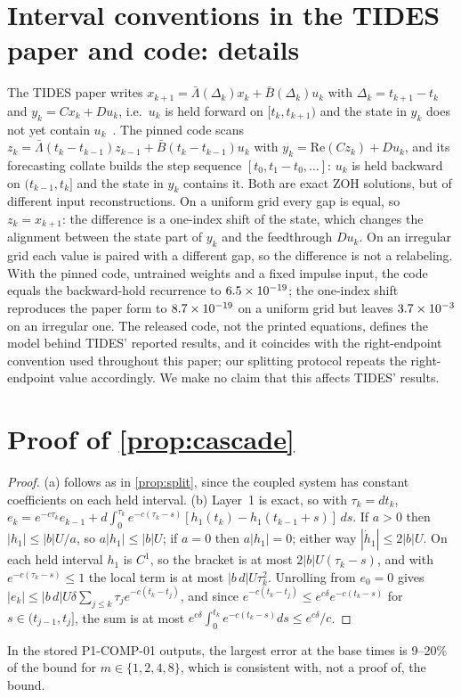 \documentclass{article}
\theoremstyle{plain}
\theoremstyle{definition}
\theoremstyle{remark}
\begin{document}




\FloatBarrier
\section{Interval conventions in the TIDES paper and code: details}
\label{app:convention}

The TIDES paper writes $x_{k+1}=\bar\Lambda(\Delta_k)x_k+\bar B(\Delta_k)u_k$ with $\Delta_k=t_{k+1}-t_k$ and $y_k=Cx_k+Du_k$, i.e.\ $u_k$ is held forward on $[t_k,t_{k+1})$ and the state in $y_k$ does not yet contain $u_k$~\citep{soydan2026tides}.
The pinned code scans $z_k=\bar\Lambda(t_k-t_{k-1})z_{k-1}+\bar B(t_k-t_{k-1})u_k$ with $y_k=\mathrm{Re}(Cz_k)+Du_k$, and its forecasting collate builds the step sequence $[t_0,t_1-t_0,\dots]$: $u_k$ is held backward on $(t_{k-1},t_k]$ and the state in $y_k$ contains it.
Both are exact ZOH solutions, but of different input reconstructions.
On a uniform grid every gap is equal, so $z_k=x_{k+1}$: the difference is a one-index shift of the state, which changes the alignment between the state part of $y_k$ and the feedthrough $Du_k$.
On an irregular grid each value is paired with a different gap, so the difference is not a relabeling.
With the pinned code, untrained weights and a fixed impulse input, the code equals the backward-hold recurrence to $6.5\times10^{-19}$; the one-index shift reproduces the paper form to $8.7\times10^{-19}$ on a uniform grid but leaves $3.7\times10^{-3}$ on an irregular one.
The released code, not the printed equations, defines the model behind TIDES' reported results, and it coincides with the right-endpoint convention used throughout this paper; our splitting protocol repeats the right-endpoint value accordingly.
We make no claim that this affects TIDES' results.

\FloatBarrier
\section{Proof of \texorpdfstring{\cref{prop:cascade}}{Proposition 4.2}}
\label{app:proof}

\begin{proof}
(a) follows as in \cref{prop:split}, since the coupled system has constant coefficients on each held interval.
(b) Layer~1 is exact, so with $\tau_k=dt_k$,
$e_k=e^{-c\tau_k}e_{k-1}+d\int_0^{\tau_k}e^{-c(\tau_k-s)}[h_1(t_k)-h_1(t_{k-1}+s)]\,ds$.
If $a>0$ then $|h_1|\le|b|U/a$, so $a|h_1|\le|b|U$; if $a=0$ then $a|h_1|=0$; either way $|\dot h_1|\le2|b|U$.
On each held interval $h_1$ is $C^1$, so the bracket is at most $2|b|U(\tau_k-s)$, and with $e^{-c(\tau_k-s)}\le1$ the local term is at most $|b\,d|U\tau_k^2$.
Unrolling from $e_0=0$ gives $|e_k|\le|b\,d|U\delta\sum_{j\le k}\tau_je^{-c(t_k-t_j)}$, and since $e^{-c(t_k-t_j)}\le e^{c\delta}e^{-c(t_k-s)}$ for $s\in(t_{j-1},t_j]$, the sum is at most $e^{c\delta}\int_0^{t_k}e^{-c(t_k-s)}ds\le e^{c\delta}/c$.
\end{proof}
In the stored P1-COMP-01 outputs, the largest error at the base times is 9--20\% of the bound for $m\in\{1,2,4,8\}$, which is consistent with, not a proof of, the bound.
\end{document}
